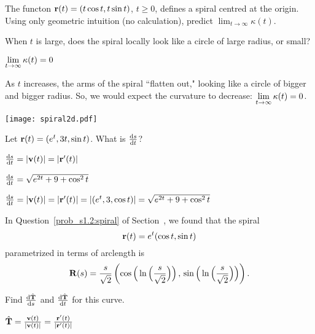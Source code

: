 \begin{question}
The functon $\mathbf{r}(t)=(t\cos t, t\sin t)$, $t \ge 0$, defines a spiral centred at the origin. 
Using only geometric intuition (no calculation), predict $\displaystyle\lim_{t \to \infty}\kappa(t)$.
\end{question}
\begin{hint}
When $t$ is large, does the spiral locally look like a circle of large radius, or small?
\end{hint}
\begin{answer}
$\lim\limits_{t \to \infty}\kappa(t)=0$
\end{answer}
\begin{solution}
As $t$ increases, the arms of the spiral ``flatten out," looking like a circle of bigger and bigger radius. So, we would expect the curvature to decrease: $\lim\limits_{t \to \infty}\kappa(t)=0$. 
\begin{center}
	\texttt{[image: spiral2d.pdf]}
\end{center}
\end{solution}
\begin{question}
Let $\mathbf{r}(t)=(e^t,3t,\sin t)$. What is $\diff{s}{t}$?
\end{question}
\begin{hint}
$\diff{s}{t}=\left| \vv(t)\right|=\left| \vr'(t)\right|$
\end{hint}
\begin{answer}
$\diff{s}{t}=\sqrt{e^{2t}+9+\cos^2 t}$
\end{answer}
\begin{solution}
$\diff{s}{t}=\left| \vv(t)\right|=\left| \vr'(t)\right|=\left| (e^t,3,\cos t)\right|=\sqrt{e^{2t}+9+\cos^2 t}$
\end{solution}
\begin{question}\label{prob_s1.3:constantsb}
In Question~\ref{prob_s1.2:spiral} of Section~,%
we found that the spiral \[\mathbf{r}(t) = e^t (\cos t, \sin t)\] parametrized in terms of arclength is 
\[\mathbf{R}(s)=\frac{s}{\sqrt{2}}\left(\cos\Big(\ln\Big(\frac{s}{\sqrt{2}}\Big)\Big)\,,\,
                 \sin\Big(\ln\Big(\frac{s}{\sqrt{2}}\Big)\Big)\right).\]
                 
Find $\diff{\hT}{s}$ and $\diff{\hT}{t}$ for this curve.
\end{question}
\begin{hint}
$\hat{\mathbf{T}}=\frac{\mathbf{v}(t)}{|\mathbf{v}(t)|}=\frac{\mathbf{r}'(t)}{|\mathbf{r}'(t)|}$
\end{hint}
